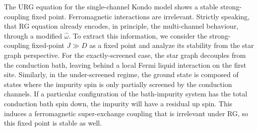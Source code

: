 \documentclass[reprint,prb,superscriptaddress]{revtex4-2}
\begin{document}
The URG equation for the single-channel Kondo model \cite{kondo_urg} shows a stable strong-coupling fixed point. Ferromagnetic interactions are irrelevant. Strictly speaking, that RG equation already encodes, in principle, the multi-channel behaviour, through a modified \(\hat \omega\). To extract this information, we consider the strong-coupling fixed-point \(J \gg D\) as a fixed point and analyze its stability from the star graph perspective. For the exactly-screened case, the star graph decouples from the conduction bath, leaving behind a local Fermi liquid interaction on the first site. Similarly, in the under-screened regime, the ground state is composed of states where the impurity spin is only partially screened by the conduction channels. If a particular configuration of the bath-impurity system has the total conduction bath spin down, the impurity will have a residual up spin. This induces a ferromagnetic super-exchange coupling that is irrelevant under RG, so this fixed point is stable as well. 
\end{document}
